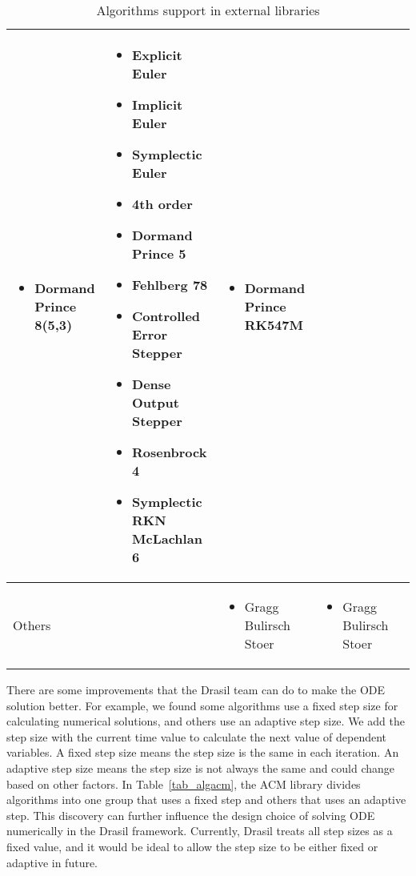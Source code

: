 \begin{sidewaystable}
\begin{adjustbox}{width=\columnwidth,center}
\begin{tabular}{p{} | p{} p{} p{} p{}}
\begin{itemize}[wide]
        \item Dormand Prince 8(5,3) 
        \end{itemize} & 
        \begin{itemize}[wide]
        \item Explicit Euler
        \item Implicit Euler
        \item Symplectic Euler
        \item 4th order
        \item Dormand Prince 5
        \item Fehlberg 78
        \item Controlled Error Stepper
        \item Dense Output Stepper
        \item Rosenbrock 4
        \item Symplectic RKN McLachlan 6
        \end{itemize} & 
        \begin{itemize}[wide]
        \item Dormand Prince RK547M
        \end{itemize} \\ \hline
    Others && 
        \begin{itemize}[wide]
        \item Gragg Bulirsch Stoer 
        \end{itemize} & 
        \begin{itemize}[wide]
        \item Gragg Bulirsch Stoer 
        \end{itemize} &\\
    \bottomrule	
\end{tabular}
\end{adjustbox}
\caption{Algorithms support in external libraries}	
\label{tab_algoexlib}
\end{sidewaystable}

There are some improvements that the Drasil team can do to make the ODE solution better. For example, we found some algorithms use a fixed step size for calculating numerical solutions, and others use an adaptive step size. We add the step size with the current time value to calculate the next value of dependent variables. A fixed step size means the step size is the same in each iteration. An adaptive step size means the step size is not always the same and could change based on other factors. In Table~\ref{tab_algacm}, the ACM library divides algorithms into one group that uses a fixed step and others that uses an adaptive step. This discovery can further influence the design choice of solving ODE numerically in the Drasil framework. Currently, Drasil treats all step sizes as a fixed value, and it would be ideal to allow the step size to be either fixed or adaptive in future.

